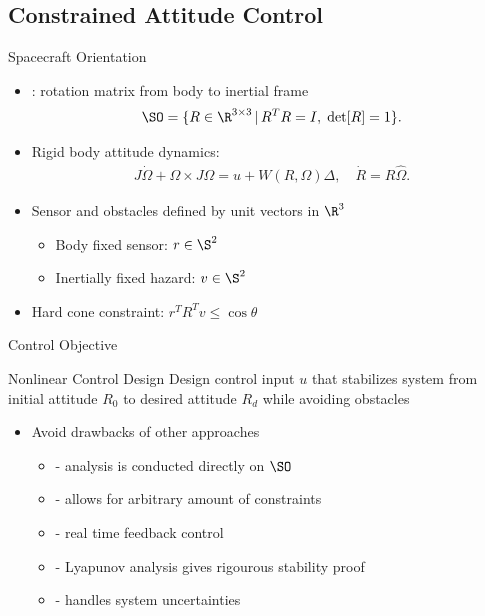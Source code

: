 \subsection[Autonomous Spacecraft attitude control with obstacles]{Constrained Attitude Control}



\begin{frame}{Spacecraft Orientation} %

\begin{itemize}

    \item {}: rotation matrix from body to inertial frame
     \[\SO =  \{R\in\R^{3\times 3}\,|\, R^TR=I,\;\mathrm{det}[R]=1\} . \]
    \item Rigid body attitude dynamics:
    \begin{gather*}
        J\dot\Omega + \Omega\times J\Omega = u+W(R,\Omega)\Delta , \quad \dot R = R\hat\Omega .
    \end{gather*}

    \item Sensor and obstacles defined by unit vectors in \( \R^3 \) 
        \begin{itemize}
            \item Body fixed sensor: \( r \in \S^2\)
            \item Inertially fixed hazard: \( v \in \S^2 \)
        \end{itemize} 
    \vs
    \item Hard cone constraint: \( r^T R^T v \leq \cos \theta \)
    
\end{itemize}
\end{frame}   %

\begin{frame}{Control Objective} %

    \begin{block}{Nonlinear Control Design}
        Design control input \( u \) that stabilizes system from initial attitude \( R_0 \) to desired attitude \( R_d \) while avoiding obstacles
    \end{block}
    \pause
    \vs
    \begin{itemize}
        \item Avoid drawbacks of other approaches 
        \begin{itemize}
            \item {} - analysis is conducted directly on \( \SO \) 
            \item {} - allows for arbitrary amount of constraints
            \item {} - real time feedback control
            \item {} - Lyapunov analysis gives rigourous stability proof
            \item {} - handles system uncertainties
        \end{itemize}
    \end{itemize}
\end{frame}

